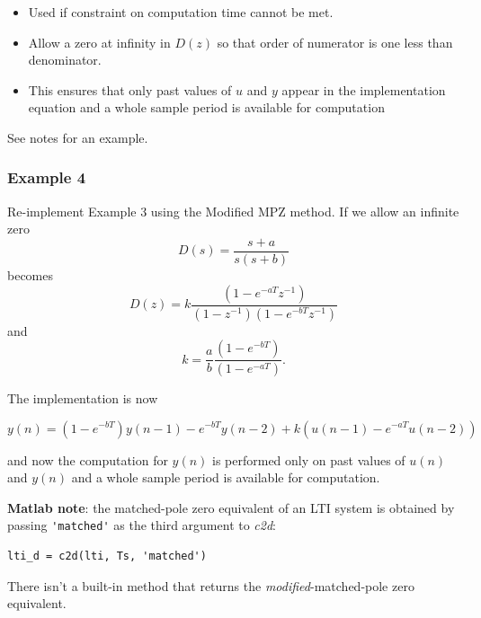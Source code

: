 \begin{slide}\label{slides:l11s26}
	\begin{itemize}
	\item
	Used if constraint on computation time cannot be met.

	\item Allow a zero at infinity in $D(z)$ so that order of numerator is one less than denominator.

	\item This ensures that only past values of $u$ and $y$ appear in the implementation equation and a whole sample period is available for computation

\end{itemize}
See notes for an example.
\end{slide}

\subsubsection*{Example 4}

Re-implement Example 3 using the Modified MPZ method. If we allow an infinite zero $$D(s)=\frac{s+a}{s(s+b)}$$ becomes $$D(z)=k\frac{(1-e^{-aT}z^{-1})}{(1-z^{-1})(1-e^{-bT}z^{-1})}$$ and $$k=\frac{a}{b}\frac{(1-e^{-bT})}{(1-e^{-aT})}.$$

The implementation is now

$$y(n) = (1 - e^{-bT})y(n-1)-e^{-bT}y(n-2)+k(u(n-1)-e^{-aT}u(n-2))$$

and now the computation for $y(n)$ is performed only on past values of $u(n)$ and $y(n)$ and a whole sample period is available for computation.

\textbf{Matlab note}: the matched-pole zero equivalent of an LTI system is obtained by passing \verb|'matched'| as the third argument to \emph{c2d}:
\begin{verbatim}
lti_d = c2d(lti, Ts, 'matched')
\end{verbatim}
There isn't a built-in method that returns the \emph{modified}-matched-pole zero equivalent.


\endinput

